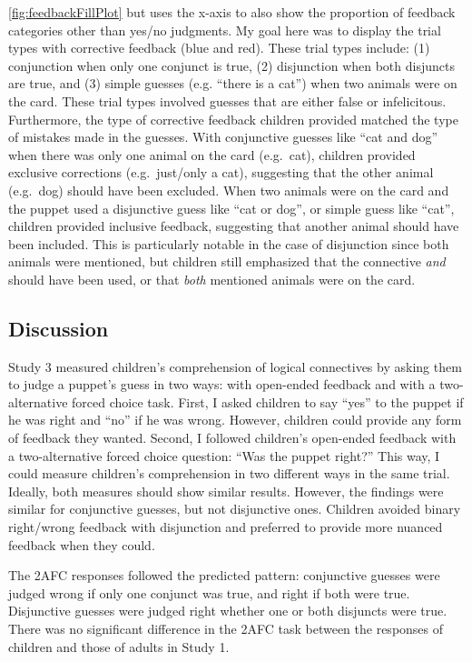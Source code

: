 \documentclass[oneside]{report}
\theoremstyle{definition}
\theoremstyle{definition}
\theoremstyle{definition}
\theoremstyle{remark}
\begin{document}
\ref{fig:feedbackFillPlot} but uses the x-axis to also show the
proportion of feedback categories other than yes/no judgments. My goal
here was to display the trial types with corrective feedback (blue and
red). These trial types include: (1) conjunction when only one conjunct
is true, (2) disjunction when both disjuncts are true, and (3) simple
guesses (e.g. ``there is a cat'') when two animals were on the card.
These trial types involved guesses that are either false or
infelicitous. Furthermore, the type of corrective feedback children
provided matched the type of mistakes made in the guesses. With
conjunctive guesses like ``cat and dog'' when there was only one animal
on the card (e.g.~cat), children provided exclusive corrections
(e.g.~just/only a cat), suggesting that the other animal (e.g.~dog)
should have been excluded. When two animals were on the card and the
puppet used a disjunctive guess like ``cat or dog'', or simple guess
like ``cat'', children provided inclusive feedback, suggesting that
another animal should have been included. This is particularly notable
in the case of disjunction since both animals were mentioned, but
children still emphasized that the connective \emph{and} should have
been used, or that \emph{both} mentioned animals were on the card.

\subsection{Discussion}\label{discussion-5}

Study 3 measured children's comprehension of logical connectives by
asking them to judge a puppet's guess in two ways: with open-ended
feedback and with a two-alternative forced choice task. First, I asked
children to say ``yes'' to the puppet if he was right and ``no'' if he
was wrong. However, children could provide any form of feedback they
wanted. Second, I followed children's open-ended feedback with a
two-alternative forced choice question: ``Was the puppet right?'' This
way, I could measure children's comprehension in two different ways in
the same trial. Ideally, both measures should show similar results.
However, the findings were similar for conjunctive guesses, but not
disjunctive ones. Children avoided binary right/wrong feedback with
disjunction and preferred to provide more nuanced feedback when they
could.

The 2AFC responses followed the predicted pattern: conjunctive guesses
were judged wrong if only one conjunct was true, and right if both were
true. Disjunctive guesses were judged right whether one or both
disjuncts were true. There was no significant difference in the 2AFC
task between the responses of children and those of adults in Study 1.
\end{document}
